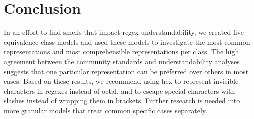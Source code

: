 
\section{Conclusion}
\label{sec:conclusion}
In an effort to find smells that impact regex understandability, we created five equivalence class models and used these models to investigate the most common representations and most comprehensible representations per class.  
 The high agreement between the community standards and understandability analyses  suggests that one particular representation can be preferred over others in most cases.  
Based on these results, we recommend using hex to represent invisible characters in regexes instead of octal, and to escape special characters with slashes instead of wrapping them in brackets.  
Further research is needed into more granular models that treat common specific cases separately.
